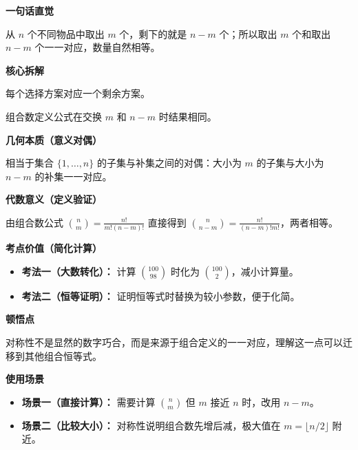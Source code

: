 \begin{explanationbox}
	\textbf{\textcolor{CExplanation}{一句话直觉}}

	从 $n$ 个不同物品中取出 $m$ 个，剩下的就是 $n-m$ 个；所以取出 $m$ 个和取出 $n-m$ 个一一对应，数量自然相等。

	\medskip
	\textbf{\textcolor{CExplanation}{核心拆解}}
	\begin{description}[style=nextline, leftmargin=2.8em, labelsep=0.5em, itemsep=0.45em]
		\item[\textbf{要点一（一一对应）：}] 每个选择方案对应一个剩余方案。
		\item[\textbf{要点二（公式一致）：}] 组合数定义公式在交换 $m$ 和 $n-m$ 时结果相同。
	\end{description}

	\medskip
	\textbf{\textcolor{CExplanation}{几何本质（意义对偶）}}

	相当于集合 $\{1,\dots,n\}$ 的子集与补集之间的对偶：大小为 $m$ 的子集与大小为 $n-m$ 的补集一一对应。

	\medskip
	\textbf{\textcolor{CExplanation}{代数意义（定义验证）}}

	由组合数公式 $\binom{n}{m} = \frac{n!}{m!(n-m)!}$ 直接得到 $\binom{n}{n-m} = \frac{n!}{(n-m)!m!}$，两者相等。

	\medskip
	\textbf{\textcolor{CExplanation}{考点价值（简化计算）}}
	\begin{itemize}[leftmargin=*, itemsep=0.5em, topsep=0.4em]
		\item \textbf{考法一（大数转化）：} 计算 $\binom{100}{98}$ 时化为 $\binom{100}{2}$，减小计算量。
		\item \textbf{考法二（恒等证明）：} 证明恒等式时替换为较小参数，便于化简。
	\end{itemize}

	\medskip
	\textbf{\textcolor{CExplanation}{顿悟点}}

	对称性不是显然的数字巧合，而是来源于组合定义的一一对应，理解这一点可以迁移到其他组合恒等式。

	\medskip
	\textbf{\textcolor{CExplanation}{使用场景}}
	\begin{itemize}[leftmargin=*, itemsep=0.5em, topsep=0.4em]
		\item \textbf{场景一（直接计算）：} 需要计算 $\binom{n}{m}$ 但 $m$ 接近 $n$ 时，改用 $n-m$。
		\item \textbf{场景二（比较大小）：} 对称性说明组合数先增后减，极大值在 $m=\lfloor n/2\rfloor$ 附近。
	\end{itemize}
\end{explanationbox}
